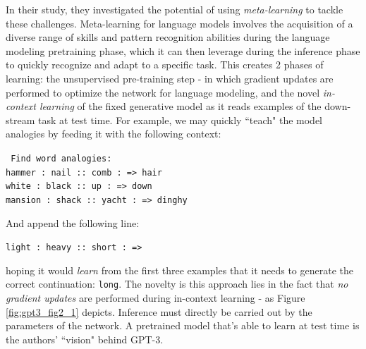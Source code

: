 \documentclass{article}
\begin{document}
\medskip
\noindent
In their study, they investigated the potential of using \emph{meta-learning} to tackle these challenges. Meta-learning for language models involves the acquisition of a diverse range of skills and pattern recognition abilities during the language modeling pretraining phase, which it can then leverage during the inference phase to quickly recognize and adapt to a specific task. This creates 2 phases of learning: the unsupervised pre-training step - in which gradient updates are performed to optimize the network for language modeling, and the novel \emph{in-context learning} of the fixed generative model as it reads examples of the down-stream task at test time. For example, we may quickly ``teach" the model analogies by feeding it with the following context:
\begin{center}
    \texttt{
        Find word analogies: \\
        hammer : nail :: comb : => hair \\
        white : black :: up : => down \\
        mansion : shack :: yacht : => dinghy\\}
\end{center}
And append the following line:
\begin{center}
    \texttt{light : heavy :: short : => }
\end{center}
hoping it would \emph{learn} from the first three examples that it needs to generate the correct continuation: \texttt{long}. The novelty is this approach lies in the fact that \emph{no gradient updates} are performed during in-context learning - as Figure \ref{fig:gpt3_fig2_1} depicts. Inference must directly be carried out by the parameters of the network. A pretrained model that's able to learn at test time is the authors' ``vision" behind GPT-3.
\end{document}
